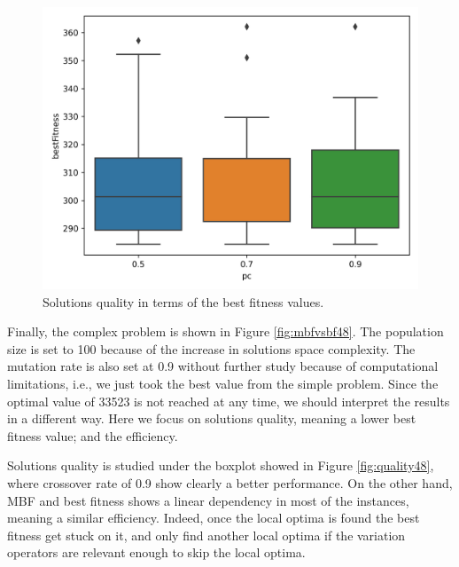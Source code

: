 \documentclass[10pt,a4paper]{article}
\begin{document}
\begin{figure}[h!]
    \centering
    \includegraphics[scale=0.75]{../figures/16citiesquality.png}
    \caption{Solutions quality in terms of the best fitness values.}
    \label{fig:quality16}
\end{figure}

Finally, the complex problem is shown in Figure \ref{fig:mbfvsbf48}. The population size is set to 100 because of the increase in solutions space complexity. The mutation rate is also set at 0.9 without further study because of computational limitations, i.e., we just took the best value from the simple problem. Since the optimal value of 33523 is not reached at any time, we should interpret the results in a different way. Here we focus on solutions quality, meaning a lower best fitness value; and the efficiency. 

Solutions quality is studied under the boxplot showed in Figure \ref{fig:quality48}, where crossover rate of 0.9 show clearly a better performance. On the other hand, MBF and best fitness shows a linear dependency in most of the instances, meaning a similar efficiency. Indeed, once the local optima is found the best fitness get stuck on it, and only find another local optima if the variation operators are relevant enough to skip the local optima.
\end{document}
